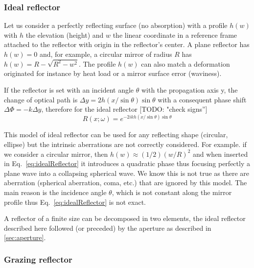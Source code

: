 \documentclass[]{spie}  %
\newcommand{\todo}[1]{{\color{red}[TODO: "#1'']}}
\begin{document}
\subsubsection{Ideal reflector}
\label{sec:idealReflector}

Let us consider a perfectly reflecting surface (no absorption) with a profile $h(w)$ with $h$ the elevation (height) and $w$ the linear coordinate in a reference frame attached to the reflector with origin in the reflector's center. A plane reflector has $h(w)=0$ and, for example, a circular mirror of radius $R$ has $h(w)=R-\sqrt{R^2 - w^2}$. The profile $h(w)$ can also match a deformation originated for instance by heat load or a mirror surface error (waviness).

If the reflector is set with an incident angle $\theta$ with the propagation axis y, the change of optical path is $\Delta y = 2 h(x/\sin \theta) \sin \theta$ with a consequent phase shift $\Delta \Phi = - k \Delta y $, therefore for the ideal reflector \todo{check signs}
\begin{equation}
\label{eq:idealReflector}
    R(x;\omega) = e^{-2 i k h(x/\sin \theta) \sin \theta}
\end{equation} 

This model of ideal reflector can be used for any reflecting shape (circular, ellipse) but the intrinsic aberrations are not correctly considered. For example. if we consider a circular mirror, then $h(w) \approx (1/2) (w/R)^2$ and when inserted in Eq.~\ref{eq:idealReflector} it introduces a quadratic phase thus focusing perfectly a plane wave into a collapsing spherical wave. We know this is not true as there are aberration (spherical aberration, coma, etc.) that are ignored by this model. The main reason is the incidence angle $\theta$, which is not constant along the mirror profile thus Eq.~\ref{eq:idealReflector} is not exact.

A reflector of a finite size can be decomposed in two elements, the ideal reflector described here followed (or preceded) by the aperture as described in \ref{sec:aperture}.

\subsubsection{Grazing reflector}
\label{sec:grazingReflector}
\end{document}
